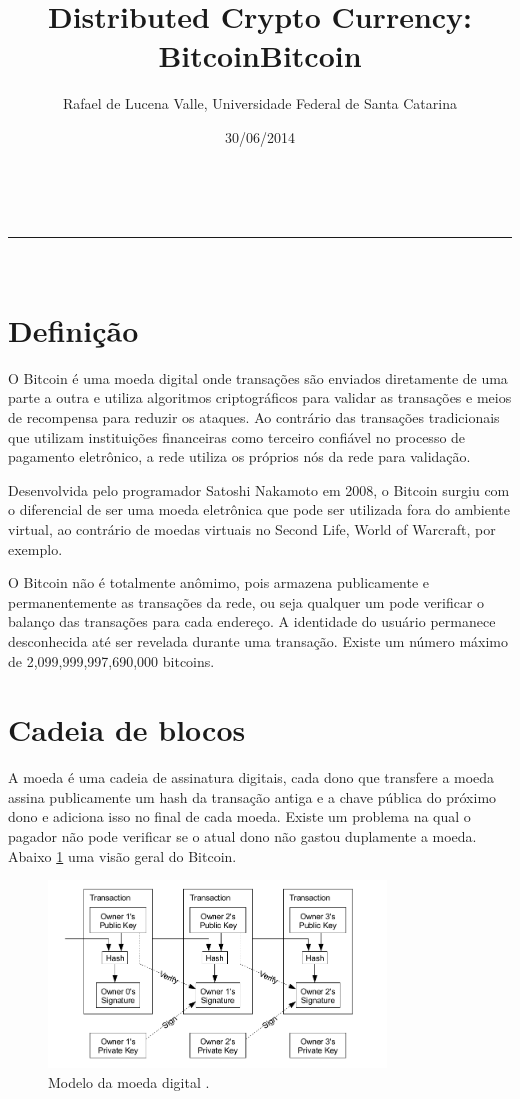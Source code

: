 \documentclass[a4paper,11pt]{article}
\makeatletter
\newcommand{\linia}{\rule{\linewidth}{0.5pt}}
\theoremstyle{mytheor}
\renewcommand{\maketitle}{
\begin{center}
\vspace{2ex}
{\huge \textsc{\@title}}
\vspace{1ex}
\\
\linia\\
\@author \hfill \@date
\vspace{4ex}
\end{center}
}
\makeatother
\begin{document}
\title{Distributed Crypto Currency: Bitcoin}

\author{Rafael de Lucena Valle, Universidade Federal de Santa Catarina}

\date{30/06/2014}

\maketitle

\title{Bitcoin}

\section*{Definição}
O Bitcoin é uma moeda digital onde transações são enviados diretamente de uma parte a outra e utiliza algoritmos criptográficos para validar as transações e meios de recompensa para reduzir os ataques. Ao contrário das transações tradicionais que utilizam instituições financeiras como terceiro confiável no processo de pagamento eletrônico, a rede utiliza os próprios nós da rede para validação. 

Desenvolvida pelo programador Satoshi Nakamoto em 2008, o Bitcoin surgiu com o diferencial de ser uma moeda eletrônica que pode ser utilizada fora do ambiente virtual, ao contrário de moedas virtuais no Second Life, World of Warcraft, por exemplo.

O Bitcoin não é totalmente anômimo, pois armazena publicamente e permanentemente as transações da rede, ou seja qualquer um pode verificar o balanço das transações para cada endereço. A identidade do usuário permanece desconhecida até ser revelada durante uma transação. Existe um número máximo de 2,099,999,997,690,000 bitcoins.

\section*{Cadeia de blocos}
A moeda é uma cadeia de assinatura digitais, cada dono que transfere a moeda assina publicamente um hash da transação antiga e a chave pública do próximo dono e adiciona isso no final de cada moeda. Existe um problema na qual o pagador não pode verificar se o atual dono não gastou duplamente a moeda. Abaixo \ref{bitcoin} uma visão geral do Bitcoin.

\begin{figure}[H]
   \label{bitcoin}
   \centering
   \includegraphics[width=0.8\textwidth]{images/coin.png}
   \caption{Modelo da moeda digital \cite{nakamoto2008bitcoin}.}
\end{figure}
\end{document}
